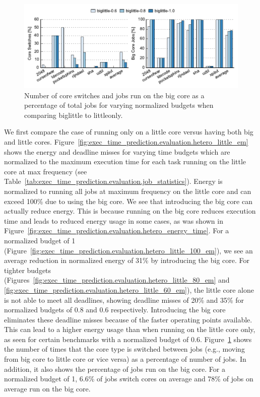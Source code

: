 \begin{figure}
  \begin{center}
    \includegraphics{exec_time_prediction/data/hetero_little_counts.pdf}
    \caption{Number of core switches and jobs run on the big core as a
    percentage of total jobs for varying normalized budgets when comparing
    biglittle to littleonly.}
    \label{fig:exec_time_prediction.evaluation.hetero_little_counts}
  \end{center}
\end{figure}

We first compare the case of running only on a little core versus having both
big and little cores.
Figure~\ref{fig:exec_time_prediction.evaluation.hetero_little_em} shows the
energy and deadline misses for varying time budgets which are normalized to the
maximum execution time for each task running on the little core at
max frequency (see Table~\ref{tab:exec_time_prediction.evaluation.job_statistics}). Energy is normalized to running all jobs at maximum frequency on
the little core and can exceed 100\% due to using the big core. We see that
introducing the big core can actually reduce energy. This is because running on
the big core reduces execution time and leads to reduced energy usage in some cases, as was
shown in Figure~\ref{fig:exec_time_prediction.evaluation.hetero_energy_time}.
For a normalized budget of 1
(Figure~\ref{fig:exec_time_prediction.evaluation.hetero_little_100_em}), we see
an average reduction in normalized energy
of 31\% by introducing the big core. 
For tighter budgets
(Figures~\ref{fig:exec_time_prediction.evaluation.hetero_little_80_em} and
\ref{fig:exec_time_prediction.evaluation.hetero_little_60_em}), the little core
alone is not able to meet all deadlines, showing deadline
misses of 20\% and 35\% for normalized budgets of 0.8 and 0.6 respectively.
Introducing the big core eliminates these deadline misses because of the faster
operating points available.  This can lead to a higher energy usage than when
running on the little core only, as seen for certain benchmarks with a
normalized budget of 0.6.
Figure~\ref{fig:exec_time_prediction.evaluation.hetero_little_counts} shows the
number of 
times that the core type is switched between jobs (e.g., moving from big core
to little core or vice versa) as a percentage of number of jobs. In addition,
it also shows the percentage of jobs run on the big core. For a normalized
budget of 1, 6.6\% of jobs switch cores on average and 78\% of jobs on average
run on the big core.

